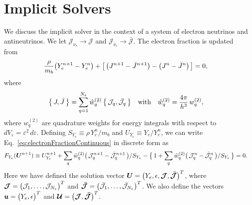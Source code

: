 \documentclass[12pt]{article}
\begin{document}
\section{Implicit Solvers}

We discuss the implicit solver in the context of a system of electron neutrinos and antineutrinos.  
We let $\mathcal{J}_{\nu_{e}}\to\mathcal{J}$ and $\mathcal{J}_{\bar{\nu}_{e}}\to\bar{\mathcal{J}}$.  
The electron fraction is updated from
\begin{equation}
  \frac{\rho}{m_{b}}\big(Y_{e}^{n+1}-Y_{e}^{n}\big) + \big[\,\big(J^{n+1}-\bar{J}^{n+1}\big)-\big(J^{n}-\bar{J}^{n}\big)\,\big] = 0,
  \label{eq:electronFractionContinuous}
\end{equation}
where
\begin{equation}
  \big\{\,J,\bar{J}\,\big\}
  =\sum_{q=1}^{N_{\varepsilon}}\hat{w}_{q}^{(2)}\,\big\{\,\mathcal{J}_{q},\bar{\mathcal{J}}_{q}\,\big\}
  \quad\text{with}\quad
  \hat{w}_{q}^{(2)}=\frac{4\pi}{h^{3}}\,w_{q}^{(2)},
\end{equation}
where $w_{q}^{(2)}$ are quadrature weights for energy integrals with respect to $dV_{\varepsilon}=\varepsilon^{2}\,d\varepsilon$.  
Defining $S_{Y_{e}}\equiv \rho\,Y_{e}^{n}/m_{b}$ and $U_{Y_{e}} \equiv Y_{e}/Y_{e}^{n}$, we can write Eq.~\eqref{eq:electronFractionContinuous} in discrete form as
\begin{equation}
  F_{Y_{e}}(\boldsymbol{U}^{n+1})\equiv
  U_{Y_{e}}^{n+1} + \sum_{q}\hat{w}_{q}^{(2)}\big(\,\mathcal{J}_{q}^{n+1}-\bar{\mathcal{J}}_{q}^{n+1}\,\big)/S_{Y_{e}} 
  - \big\{\,1+\sum_{q}\hat{w}_{q}^{(2)}\big(\,\mathcal{J}_{q}^{n}-\bar{\mathcal{J}}_{q}^{n}\,\big)/S_{Y_{e}}\,\big\} = 0.
  \label{eq:electronFractionDiscrete}
\end{equation}
Here we have defined the solution vector $\boldsymbol{U}=\big(Y_{e},\epsilon,\boldsymbol{\mathcal{J}},\boldsymbol{\bar{\mathcal{J}}}\big)^{T}$, where $\boldsymbol{\mathcal{J}}=\big(\mathcal{J}_{1},\ldots,\mathcal{J}_{N_{\varepsilon}}\big)^{T}$ and $\boldsymbol{\bar{\mathcal{J}}}=\big(\bar{\mathcal{J}}_{1},\ldots,\bar{\mathcal{J}}_{N_{\varepsilon}}\big)^{T}$.  
We also define the vectors $\boldsymbol{u}=\big(Y_{e},\epsilon\big)^{T}$ and $\boldsymbol{\mathcal{U}}=\big(\boldsymbol{\mathcal{J}},\boldsymbol{\bar{\mathcal{J}}}\big)^{T}$.  
\end{document}
